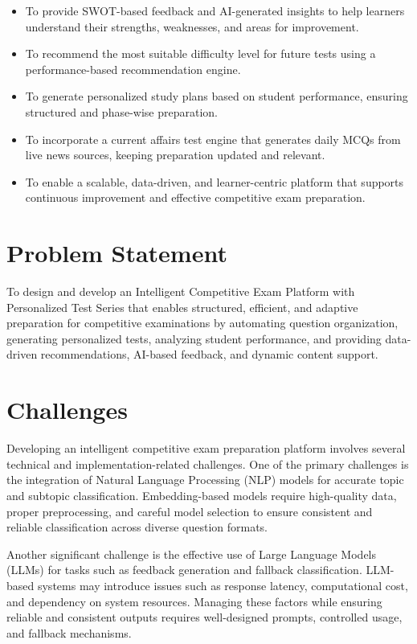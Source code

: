 \begin{sloppypar}
\begin{itemize}
    \item To provide SWOT-based feedback and AI-generated insights to help learners understand their strengths, weaknesses, and areas for improvement.

    \item To recommend the most suitable difficulty level for future tests using a performance-based recommendation engine.

    \item To generate personalized study plans based on student performance, ensuring structured and phase-wise preparation.

    \item To incorporate a current affairs test engine that generates daily MCQs from live news sources, keeping preparation updated and relevant.

    \item To enable a scalable, data-driven, and learner-centric platform that supports continuous improvement and effective competitive exam preparation.
\end{itemize}

\section{Problem Statement}

To design and develop an Intelligent Competitive Exam Platform with Personalized Test Series that enables structured, efficient, and adaptive preparation for competitive examinations by automating question organization, generating personalized tests, analyzing student performance, and providing data-driven recommendations, AI-based feedback, and dynamic content support.

\section{Challenges}

Developing an intelligent competitive exam preparation platform involves several technical and implementation-related challenges. One of the primary challenges is the integration of Natural Language Processing (NLP) models for accurate topic and subtopic classification. Embedding-based models require high-quality data, proper preprocessing, and careful model selection to ensure consistent and reliable classification across diverse question formats.

Another significant challenge is the effective use of Large Language Models (LLMs) for tasks such as feedback generation and fallback classification. LLM-based systems may introduce issues such as response latency, computational cost, and dependency on system resources. Managing these factors while ensuring reliable and consistent outputs requires well-designed prompts, controlled usage, and fallback mechanisms.


\end{sloppypar}

